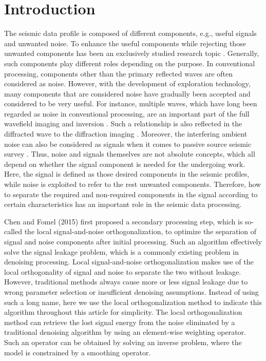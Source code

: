 
\section{Introduction}
The seismic data profile is composed of different components, e.g., useful signals and unwanted noise. To enhance the useful components while rejecting those unwanted components has been an exclusively studied research topic \cite{canales1984,yangkang20141,yanan2014,yangkang20142,curveletieee2016,mostafa2016geo,weilin2016dmssa,xue2017full,shaohuan2018ieee,wang2019hankel,yangkang2019nc,wang2019efficient,omar2020geo1,wanghang2021geo}. Generally, such components play different roles depending on the purpose. In conventional processing, components other than the primary reflected waves are often considered as noise. However, with the development of exploration technology, many components that are considered noise have gradually been accepted and considered to be very useful. For instance, multiple waves, which have long been regarded as noise in conventional processing, are an important part of the full wavefield imaging and inversion \cite{verschuur2011}.  Such a relationship is also reflected in the diffracted wave to the diffraction imaging \cite{fomel2007}. Moreover, the interfering ambient noise can also be considered as signals when it comes to passive source seismic survey \cite{de2011ambient}. Thus, noise and signals themselves are not absolute concepts, which all depend on whether the signal component is needed for the undergoing work. Here, the signal is defined as those desired components in the seismic profiles, while noise is exploited to refer to the rest unwanted components. Therefore, how to separate the required and non-required components in the signal according to certain characteristics has an important role in the seismic data processing.

Chen and Fomel (2015) \cite{yangkang2015ortho} first proposed a secondary processing step, which is so-called the local signal-and-noise orthogonalization, to optimize the separation of signal and noise components after initial processing.  Such an algorithm effectively solve the signal leakage problem, which is a commonly existing problem in denoising processing. Local signal-and-noise orthogonalization makes use of the local orthogonality of signal and noise to separate the two without leakage. However, traditional methods always cause more or less signal leakage due to wrong parameter selection or insufficient denoising assumptions. Instead of using such a long name, here we use the local orthogonalization method to indicate this algorithm throughout this article for simplicity. The local orthogonalization method can retrieve the lost signal energy from the noise eliminated by a traditional denoising algorithm by using an element-wise weighting operator. Such an operator can be obtained by solving an inverse problem, where the model is constrained by a smoothing operator. 

